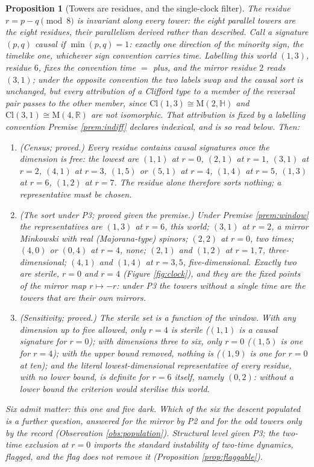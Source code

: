 \documentclass[11pt]{article}
\newtheorem{proposition}[theorem]{Proposition}
\theoremstyle{definition}
\newcommand{\Cl}{\mathrm{Cl}}
\newcommand{\R}{\mathbb{R}}
\newcommand{\Mat}{\mathrm{M}}
\begin{document}
\begin{proposition}[Towers are residues, and the single-clock filter]\label{prop:residues}
The residue $r = p - q \pmod 8$ is invariant along every tower: the eight parallel towers are the eight residues, their parallelism derived rather than described. Call a signature $(p,q)$ \emph{causal} if $\min(p,q) = 1$: exactly one direction of the minority sign, the timelike one, whichever sign convention carries time. Labelling this world $(1,3)$, residue $6$, fixes the convention time $=$ plus, and the mirror residue $2$ reads $(3,1)$; under the opposite convention the two labels swap and the causal sort is unchanged, but every attribution of a Clifford type to a member of the reversal pair passes to the other member, since $\Cl(1,3) \cong \Mat(2,\mathbb{H})$ and $\Cl(3,1) \cong \Mat(4,\R)$ are not isomorphic. That attribution is fixed by a labelling convention Premise \ref{prem:indiff} declares indexical, and is so read below. Then:
\begin{enumerate}
\item[(i)] \emph{(Census; proved.)} Every residue contains causal signatures once the dimension is free: the lowest are $(1,1)$ at $r = 0$, $(2,1)$ at $r = 1$, $(3,1)$ at $r = 2$, $(4,1)$ at $r = 3$, $(1,5)$ or $(5,1)$ at $r = 4$, $(1,4)$ at $r = 5$, $(1,3)$ at $r = 6$, $(1,2)$ at $r = 7$. The residue alone therefore sorts nothing; a representative must be chosen.
\item[(ii)] \emph{(The sort under P3; proved given the premise.)} Under Premise \ref{prem:window} the representatives are $(1,3)$ at $r = 6$, this world; $(3,1)$ at $r = 2$, a mirror Minkowski with real (Majorana-type) spinors; $(2,2)$ at $r = 0$, two times; $(4,0)$ or $(0,4)$ at $r = 4$, none; $(2,1)$ and $(1,2)$ at $r = 1, 7$, three-dimensional; $(4,1)$ and $(1,4)$ at $r = 3, 5$, five-dimensional. Exactly two are sterile, $r = 0$ and $r = 4$ (Figure \ref{fig:clock}), and they are the fixed points of the mirror map $r \mapsto -r$: under P3 the towers without a single time are the towers that are their own mirrors.
\item[(iii)] \emph{(Sensitivity; proved.)} The sterile set is a function of the window. With any dimension up to five allowed, only $r = 4$ is sterile ($(1,1)$ is a causal signature for $r = 0$); with dimensions three to six, only $r = 0$ ($(1,5)$ is one for $r = 4$); with the upper bound removed, nothing is ($(1,9)$ is one for $r = 0$ at ten); and the literal lowest-dimensional representative of every residue, with no lower bound, is definite for $r = 6$ itself, namely $(0,2)$: without a lower bound the criterion would sterilise this world.
\end{enumerate}
Six admit matter: this one and five dark. Which of the six the descent populated is a further question, answered for the mirror by P2 and for the odd towers only by the record (Observation \ref{obs:population}). Structural level given P3; the two-time exclusion at $r = 0$ imports the standard instability of two-time dynamics, flagged, and the flag does not remove it (Proposition \ref{prop:flaggable}).
\end{proposition}
\end{document}
